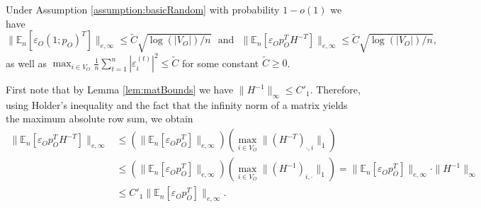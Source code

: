 \documentclass[opre,nonblindrev]{informs3} %
\def\En{{\mathbb{E}_n}}
\begin{document}
\begin{APPENDIX}{}
 	
 	\begin{lemma}\label{lemma:auxBoundsLinfty}
 		Under Assumption
 		\ref{assumption:basicRandom}  with probability $1-o(1)$ we have
 		\begin{equation}\label{eq:lemmaBounds}\| \En[ \varepsilon_O (1;p_O)^T ]\|_{e,\infty}  \leq  \tilde{C} \sqrt{\log (|V_O|)/n}  \ \ \ \mbox{and} \ \ \  \| \En[ \varepsilon_O p_O^T H^{-T} ]\|_{e,\infty}  \leq \tilde{C} \sqrt{\log (|V_O|)/n},
 		\end{equation}
 		as well as
 		$\max_{i\in V_O }
 		\frac{1}{n}\sum_{t=1}^n|\varepsilon_i^{(t)} |^2  \leq \tilde{C}$
 		for some constant $\tilde{C}\geq 0$.
 	\end{lemma}
 	First note that by Lemma \ref{lem:matBounds}
 	we have  $ \| H^{-1}\|_\infty \leq C'_1$.
 	Therefore, using Holder's inequality 
 	and the fact that the infinity norm of a matrix yields the maximum absolute row sum,
 	we obtain
 	\begin{equation}\label{eq:auxBoundLinfStep1}
 	\begin{aligned}
 	\| \En[ \varepsilon_O p_O^T H^{-T} ]\|_
 	{e,\infty}
 	&\leq 
 	\left(\| \En[ \varepsilon_O p_O^T  ]\|_{e,\infty}\right)
 	\left(
 	  \max_{i\in V_O} \| (H^{-T})_{\cdot,i}\|_1
 	  \right)
 	  \\
 	&\leq
 	\left(\| \En[ \varepsilon_O p_O^T  ]\|_{e,\infty}\right)
 	\left(
 	\max_{i\in V_O} \| (H^{-1})_{i,\cdot}\|_1
 	\right)
 	=
 \| \En[ \varepsilon_O p_O^T  ]\|_{e,\infty} \cdot \|H^{-1}\|_\infty
 	\\
 	&\leq C'_1 \| \En[ \varepsilon_O p_O^T  ]\|_{e,\infty}.  
 	\end{aligned} 	
 	\end{equation}
 	
 	
 	

\end{APPENDIX}
\end{document}
